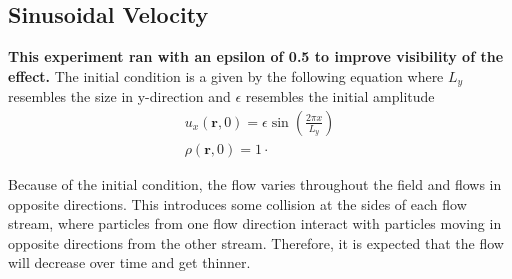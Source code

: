 \subsection{Sinusoidal Velocity}\label{subsec:sinusoidal-velocity}
\textbf{This experiment ran with an epsilon of 0.5 to improve visibility of the effect.}
The initial condition is a given by the following equation where $L_y$ resembles the size in y-direction and $\epsilon$ resembles the initial amplitude
\begin{equation*}
    \begin{gathered}
        u_x(\mathbf{r},0) = \epsilon \sin \left( \frac{2 \pi x}{L_y} \right) \\
        \rho(\mathbf{r},0) = 1 \cdot
    \end{gathered}
\end{equation*}

Because of the initial condition, the flow varies throughout the field and flows in opposite directions.
This introduces some collision at the sides of each flow stream, where particles from one flow direction interact with particles moving in opposite directions from the other stream.
Therefore, it is expected that the flow will decrease over time and get thinner.

